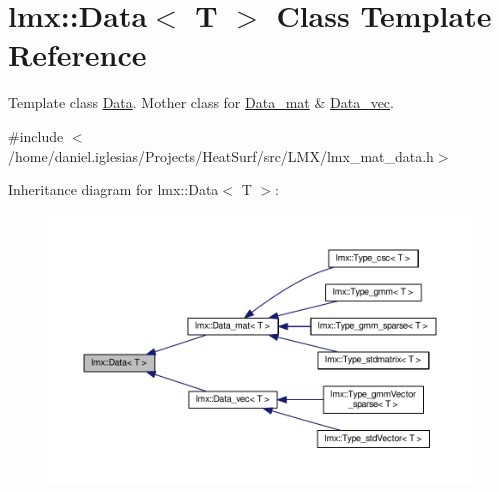 \hypertarget{classlmx_1_1Data}{\section{lmx\-:\-:Data$<$ T $>$ Class Template Reference}
\label{classlmx_1_1Data}
}


Template class \hyperlink{classlmx_1_1Data}{Data}. Mother class for \hyperlink{classlmx_1_1Data__mat}{Data\-\_\-mat} \& \hyperlink{classlmx_1_1Data__vec}{Data\-\_\-vec}.  




{\ttfamily \#include $<$/home/daniel.\-iglesias/\-Projects/\-Heat\-Surf/src/\-L\-M\-X/lmx\-\_\-mat\-\_\-data.\-h$>$}



Inheritance diagram for lmx\-:\-:Data$<$ T $>$\-:
\nopagebreak
\begin{figure}[H]
\begin{center}
\leavevmode
\includegraphics[width=350pt]{classlmx_1_1Data__inherit__graph}
\end{center}
\end{figure}
